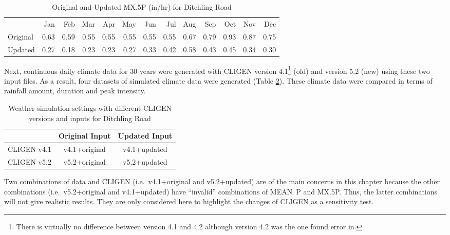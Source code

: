 \begin{table}[htbp]
  \centering
  \caption[Original and Updated {MX.5P} for Ditchling Road]{Original and
Updated {MX.5P} (in/hr) for Ditchling Road}
  \label{tab:UpdatedMX5PForDitchlingRoad}
    \footnotesize
    \begin{tabular}{lrrrrrrrrrrrr}
    \toprule
     & Jan & Feb & Mar & Apr & May & Jun & Jul & Aug & Sep & Oct &
Nov & Dec\\
    \cmidrule{2-13}
    Original & 0.63 & 0.59 & 0.55 & 0.55 & 0.55 & 0.55 & 0.55 & 0.67
& 0.79 & 0.93 & 0.87 & 0.75\\
    Updated & 0.27 & 0.18 & 0.23 & 0.23 & 0.27 & 0.33 & 0.42 & 0.58
& 0.43 & 0.45 & 0.34 & 0.30\\
    \bottomrule
    \end{tabular}
\end{table}

Next, continuous daily climate data for 30 years were generated with CLIGEN
version 4.1\footnote{There is virtually no difference between version 4.1 and
4.2 although version 4.2 was the one \citet{yu2000-301} found error in.} (old)
and version 5.2 (new) using these two input files. As a result, four datasets of
simulated climate data were generated (Table
\ref{tab:CLIGENSimulationSettingsWithDifferentInputsAndVersions}). These climate
data were compared in terms of rainfall amount, duration and peak intensity.

\begin{table}[htbp]
  \centering
  \small
  \caption{Weather simulation settings with different CLIGEN versions and inputs
for Ditchling Road}
  \label{tab:CLIGENSimulationSettingsWithDifferentInputsAndVersions}
  \begin{tabular}{ccc}
  \toprule
        & Original Input & Updated Input \\
  \midrule
  CLIGEN v4.1 & v4.1+original & v4.1+updated \\
  \midrule
  CLIGEN v5.2 & v5.2+original & v5.2+updated \\
  \bottomrule
  \end{tabular}
\end{table}

Two combinations of data and CLIGEN (i.e.\ v4.1+original and v5.2+updated) are
of the main concerns in this chapter because the other combinations (i.e.\
v5.2+original and v4.1+updated) have ``invalid'' combinations of MEAN~P and
{MX.5P}. Thus, the latter combinations will not give realistic results.
They are only considered here to highlight the changes of CLIGEN as a
sensitivity test.

